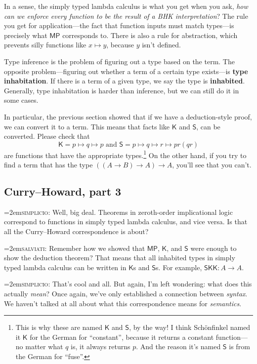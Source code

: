 \documentclass[11pt,paper=letter]{scrartcl}
\renewcommand{\sf}{\mathsf}
\newcommand{\simp}{\vspace{0.5em}\noindent\hangindent=2em\textsc{simplicio:} }
\newcommand{\salv}{\vspace{0.5em}\noindent\hangindent=2em\textsc{salviati:} }
\begin{document}
In a sense, the simply typed lambda calculus is what you get when you ask, \emph{how can we enforce every function to be the result of a BHK interpretation}? The rule you get for application---the fact that function inputs must match types---is precisely what $\sf{MP}$ corresponds to. There is also a rule for abstraction, which prevents silly functions like $x \mapsto y$, because $y$ isn't defined.

Type inference is the problem of figuring out a type based on the term. The opposite problem---figuring out whether a term of a certain type exists---is \textbf{type inhabitation}. If there is a term of a given type, we say the type is \textbf{inhabited}. Generally, type inhabitation is harder than inference, but we can still do it in some cases.

In particular, the previous section showed that if we have a deduction-style proof, we can convert it to a term. This means that facts like $\sf{K}$ and $\sf{S}$, can be converted. Please check that \[
  \sf{K} = p \mapsto q \mapsto p
  \text{ and }
  \sf{S} = p \mapsto q \mapsto r \mapsto pr(qr)
\]
are functions that have the appropriate types.\footnote{This is why these are named $\sf{K}$ and $\sf{S}$, by the way! I think Schönfinkel named it $\sf{K}$ for the German for ``constant'', because it returns a constant function---no matter what $q$ is, it always returns $p$. And the reason it's named $\sf{S}$ is from the German for ``fuse''.} On the other hand, if you try to find a term that has the type $((A \to B) \to A) \to A$, you'll see that you can't.

\subsection{Curry--Howard, part 3}

\simp Well, big deal. Theorems in zeroth-order implicational logic correspond to functions in simply typed lambda calculus, and vice versa. Is that all the Curry--Howard correspondence is about?

\salv Remember how we showed that $\sf{MP}$, $\sf{K}$, and $\sf{S}$ were enough to show the deduction theorem? That means that all inhabited types in simply typed lambda calculus can be written in $\sf{K}$s and $\sf{S}$s. For example, $\sf{S}\sf{K}\sf{K} : A \to A$.

\simp That's cool and all. But again, I'm left wondering: what does this actually \emph{mean}? Once again, we've only established a connection between \emph{syntax}. We haven't talked at all about what this correspondence means for \emph{semantics}.
\end{document}
